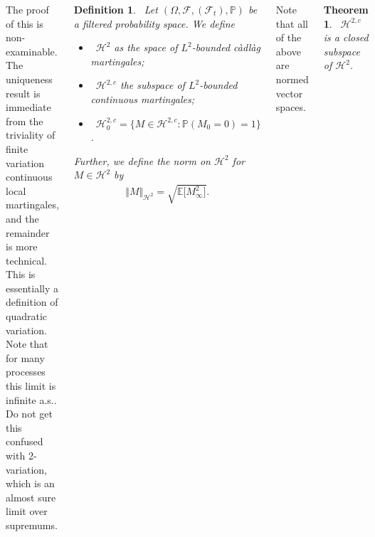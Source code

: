 \documentclass{tikzposter} %
\newtheorem{theorem}{Theorem}
\newtheorem{definition}{Definition}
\begin{document}
\begin{columns}
{    The proof of this is non-examinable. The uniqueness result is immediate from the triviality of finite variation continuous local martingales, and the remainder is more technical. \\

    This is essentially a definition of quadratic variation. Note that for many processes this limit is infinite a.s.. Do not get this confused with 2-variation, which is an almost sure limit over supremums. \\

    \begin{definition}
      \ Let $(\Omega, \mathcal{F}, (\mathcal{F}_{t}), \mathbb{P})$ be a filtered probability space. We define
      \begin{itemize}
              \item \ $\mathcal{H}^{2}$ as the space of $L^{2}$-bounded c\`adl\`ag martingales;
              \item \ $\mathcal{H}^{2,c}$ the subspace of $L^{2}$-bounded continuous martingales;
              \item \ $\mathcal{H}^{2,c}_{0} = \{M \in \mathcal{H}^{2,c} : \mathbb{P}(M_{0} = 0)=1 \}$.
      \end{itemize}
      Further, we define the norm on $\mathcal{H}^{2}$ for $M \in \mathcal{H}^{2}$ by
      \begin{align*}
        \Vert M \Vert_{\mathcal{H}^{2}} = \sqrt{\mathbb{E}\big[M^{2}_{\infty}\big]}.
      \end{align*}
    \end{definition}
    \hphantom{}

    Note that all of the above are normed vector spaces. \\

    \begin{theorem}
    \ $\mathcal{H}^{2,c}$ is a closed subspace of $\mathcal{H}^{2}$.
    \end{theorem}
    \hphantom{}

}
\end{columns}
\end{document}

